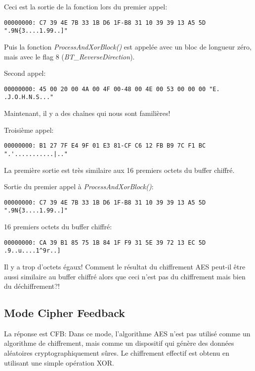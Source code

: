 Ceci est la sortie de la fonction lors du premier appel:

\begin{lstlisting}
00000000: C7 39 4E 7B 33 1B D6 1F-B8 31 10 39 39 13 A5 5D ".9N{3....1.99..]"
\end{lstlisting}

Puis la fonction \emph{ProcessAndXorBlock()} est appelée avec un bloc de longueur
zéro, mais avec le flag 8 (\emph{BT\_ReverseDirection}).

Second appel:

\begin{lstlisting}
00000000: 45 00 20 00 4A 00 4F 00-48 00 4E 00 53 00 00 00 "E. .J.O.H.N.S..."
\end{lstlisting}

Maintenant, il y a des chaînes qui nous sont familières!

Troisième appel:

\begin{lstlisting}
00000000: B1 27 7F E4 9F 01 E3 81-CF C6 12 FB B9 7C F1 BC ".'...........|.."
\end{lstlisting}

La première sortie est très similaire aux 16 premiers octets du buffer chiffré.

Sortie du premier appel à \emph{ProcessAndXorBlock()}:

\begin{lstlisting}
00000000: C7 39 4E 7B 33 1B D6 1F-B8 31 10 39 39 13 A5 5D ".9N{3....1.99..]"
\end{lstlisting}

16 premiers octets du buffer chiffré:

\begin{lstlisting}
00000000: CA 39 B1 85 75 1B 84 1F F9 31 5E 39 72 13 EC 5D  .9..u....1^9r..]
\end{lstlisting}

Il y a trop d'octets égaux!
Comment le résultat du chiffrement AES peut-il être aussi similaire au buffer chiffré
alors que ceci n'est pas du chiffrement mais bien du déchiffrement?!

\subsection{Mode Cipher Feedback}

La réponse est \ac{CFB}:
Dans ce mode, l'algorithme AES n'est pas utilisé comme un algorithme de chiffrement,
mais comme un dispositif qui génère des données aléatoires cryptographiquement sûres.
Le chiffrement effectif est obtenu en utilisant une simple opération XOR.

